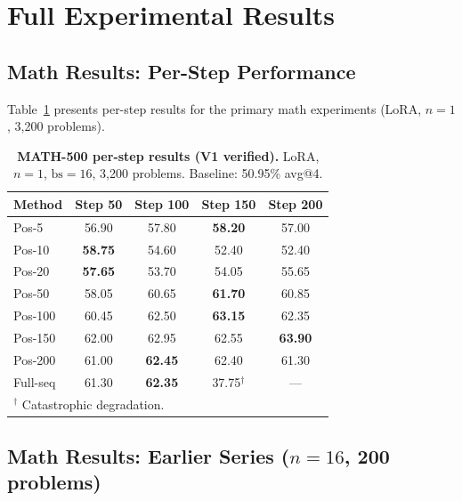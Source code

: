 \documentclass[10pt]{article}
\begin{document}
\section{Full Experimental Results}
\label{app:full_results}

\subsection{Math Results: Per-Step Performance}

Table~\ref{tab:app_math_main} presents per-step results for the primary math experiments (LoRA, $n{=}1$, 3,200 problems).

\begin{table}[!htbp]
\centering
\caption{\textbf{MATH-500 per-step results (V1 verified).} LoRA, $n{=}1$, $\text{bs}{=}16$, 3,200 problems. Baseline: 50.95\% avg@4.}
\label{tab:app_math_main}
\small
\begin{tabular}{l cccc}
\toprule
\textbf{Method} & \textbf{Step 50} & \textbf{Step 100} & \textbf{Step 150} & \textbf{Step 200} \\
\midrule
Pos-5 & 56.90 & 57.80 & \textbf{58.20} & 57.00 \\
Pos-10 & \textbf{58.75} & 54.60 & 52.40 & 52.40 \\
Pos-20 & \textbf{57.65} & 53.70 & 54.05 & 55.65 \\
Pos-50 & 58.05 & 60.65 & \textbf{61.70} & 60.85 \\
Pos-100 & 60.45 & 62.50 & \textbf{63.15} & 62.35 \\
Pos-150 & 62.00 & 62.95 & 62.55 & \textbf{63.90} \\
Pos-200 & 61.00 & \textbf{62.45} & 62.40 & 61.30 \\
Full-seq & 61.30 & \textbf{62.35} & 37.75$^\dag$ & --- \\
\bottomrule
\multicolumn{5}{l}{\footnotesize $^\dag$ Catastrophic degradation.}
\end{tabular}
\end{table}


\subsection{Math Results: Earlier Series ($n{=}16$, 200 problems)}
\end{document}
